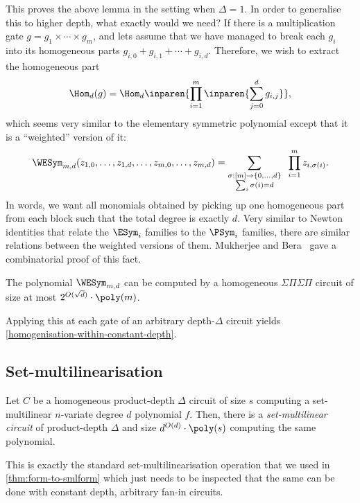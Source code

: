 This proves the above lemma in the setting when $\Delta = 1$. In order to generalise this to higher depth, what exactly would we need? If there is a multiplication gate $g = g_1 \times \cdots \times g_m$, and lets assume that we have managed to break each $g_i$ into its homogeneous parts $g_{i,0} + g_{i,1} + \cdots + g_{i,d}$. Therefore, we wish to extract the homogeneous part
\[
  \Hom_d(g) = \Hom_d\inparen{\prod_{i=1}^m \inparen{\sum_{j=0}^d g_{i,j}}},
\]
which seems very similar to the elementary symmetric polynomial except that it is a ``weighted'' version of it:
\[
  \WESym_{m,d}( z_{1,0}, \ldots, z_{1,d}, \ldots, z_{m,0}, \ldots, z_{m,d}) = \sum_{\substack{\sigma: [m]\rightarrow \{0,\ldots, d\}\\ \sum_{i} \sigma(i) = d}} \;\;\prod_{i=1}^m z_{i, \sigma(i)}.
\]
In words, we want all monomials obtained by picking up one homogeneous part from each block such that the total degree is exactly $d$. Very similar to Newton identities that relate the $\ESym_i$ families to the $\PSym_i$ families, there are similar relations between the weighted versions of them. Mukherjee and Bera~\cite{MB18} gave a combinatorial proof of this fact.

\begin{lemmawp}[\cite{MB18}]
  The polynomial $\WESym_{m,d}$ can be computed by a homogeneous $\Sigma\Pi\Sigma\Pi$ circuit of size at most $2^{O(\sqrt{d})} \cdot \poly(m)$. 
\end{lemmawp}

Applying this at each gate of an arbitrary depth-$\Delta$ circuit yields \autoref{homogenisation-within-constant-depth}.

\subsection{Set-multilinearisation}

\begin{lemma}
  \label{lem:set-multilinearisation-constant-depth}
  Let $C$ be a homogeneous product-depth $\Delta$ circuit of size $s$ computing a set-multilinear $n$-variate degree $d$ polynomial $f$. Then, there is a \emph{set-multilinear circuit} of product-depth $\Delta$ and size $d^{O(d)} \cdot \poly(s)$ computing the same polynomial. 
\end{lemma}

This is exactly the standard set-multilinearisation operation that we used in \autoref{thm:form-to-smlform} which just needs to be inspected that the same can be done with constant depth, arbitrary fan-in circuits.

